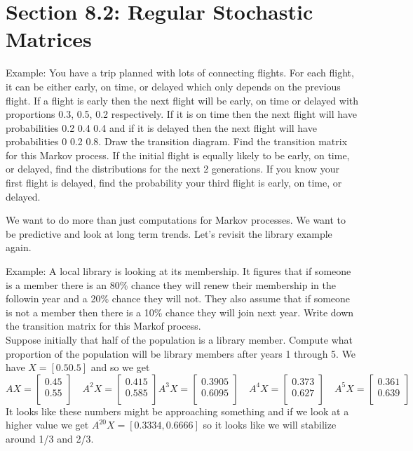 \documentclass[14,fleqn]{article}
\begin{document}
\section{Section 8.2: Regular Stochastic Matrices}

Example: You have a trip planned with lots of connecting flights. For each flight, it can be either early, on time, or delayed which only depends on the previous flight. If a flight is early then the next flight will be early, on time or delayed with proportions 0.3, 0.5, 0.2 respectively.  If it is on time then the next flight will have probabilities 0.2 0.4 0.4 and if it is delayed then the next flight will have probabilities 0 0.2 0.8. Draw the transition diagram. Find the transition matrix for this Markov process. If the initial flight is equally likely to be early, on time, or delayed, find the distributions for the next 2 generations. If you know your first flight is delayed, find the probability your third flight is early, on time, or delayed.

We want to do more than just computations for Markov processes. We want to be predictive and look at long term trends. Let's revisit the library example again.

Example: A local library is looking at its membership. It figures that if someone is a member there is an 80\% chance they will renew their membership in the followin year and a 20\% chance they will not. They also assume that if someone is not a member then there is a 10\% chance they will join next year. Write down the transition matrix for this Markof process.\\

Suppose initially that half of the population is a library member. Compute what proportion of the population will be library members after years 1 through 5. We have $X=[0.5 0.5]$ and so we get
\[
	AX=\begin{bmatrix}
		0.45\\
		0.55\\
	\end{bmatrix}
	\quad
	A^2X=\begin{bmatrix}
		0.415\\
		0.585\\
	\end{bmatrix}
	A^3X=\begin{bmatrix}
		0.3905\\
		0.6095\\
	\end{bmatrix}
	\quad
	A^4X=\begin{bmatrix}
		0.373\\
		0.627\\
	\end{bmatrix}
	\quad
	A^5X=\begin{bmatrix}
		0.361\\
		0.639\\
	\end{bmatrix}
\]
It looks like these numbers might be approaching something and if we look at a higher value we get $A^{20}X=[0.3334,0.6666]$ so it looks like we will stabilize around 1/3 and 2/3. 
\end{document}
